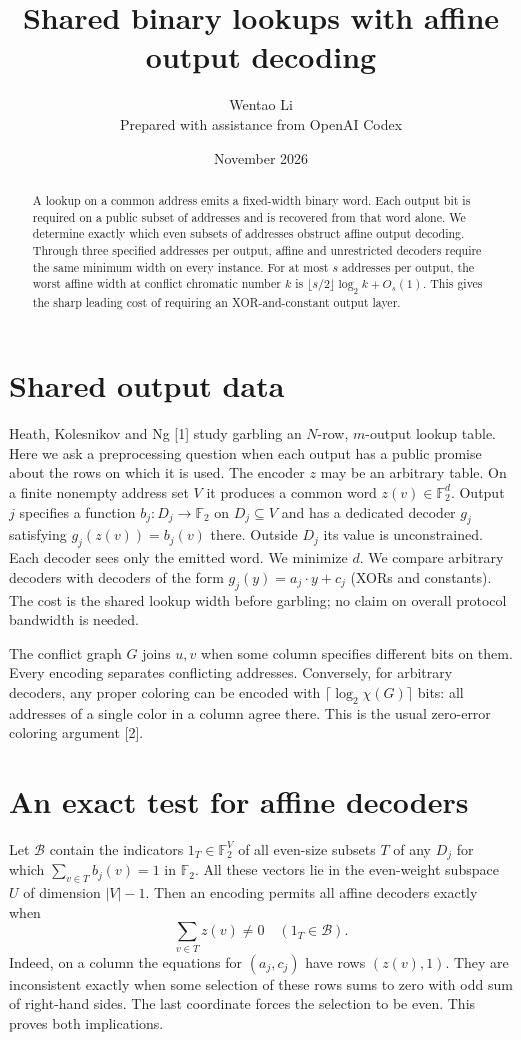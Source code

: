 \documentclass[11pt]{article}
\title{Shared binary lookups with affine output decoding}
\author{Wentao Li\\[2pt]\small Prepared with assistance from OpenAI Codex}
\date{November 2026}
\newcommand{\F}{\mathbb F_2}
\begin{document}
\maketitle
\begin{abstract}
A lookup on a common address emits a fixed-width binary word. Each output bit is required on a public subset of addresses and is recovered from that word alone. We determine exactly which even subsets of addresses obstruct affine output decoding. Through three specified addresses per output, affine and unrestricted decoders require the same minimum width on every instance. For at most $s$ addresses per output, the worst affine width at conflict chromatic number $k$ is $\lfloor s/2\rfloor\log_2 k+O_s(1)$. This gives the sharp leading cost of requiring an XOR-and-constant output layer.
\end{abstract}

\section{Shared output data}
Heath, Kolesnikov and Ng [1] study garbling an $N$-row, $m$-output lookup table. Here we ask a preprocessing question when each output has a public promise about the rows on which it is used. The encoder $z$ may be an arbitrary table. On a finite nonempty address set $V$ it produces a common word $z(v)\in\F^d$. Output $j$ specifies a function $b_j:D_j\to\F$ on $D_j\subseteq V$ and has a dedicated decoder $g_j$ satisfying $g_j(z(v))=b_j(v)$ there. Outside $D_j$ its value is unconstrained. Each decoder sees only the emitted word. We minimize $d$. We compare arbitrary decoders with decoders of the form $g_j(y)=a_j\cdot y+c_j$ (XORs and constants). The cost is the shared lookup width before garbling; no claim on overall protocol bandwidth is needed.

The conflict graph $G$ joins $u,v$ when some column specifies different bits on them. Every encoding separates conflicting addresses. Conversely, for arbitrary decoders, any proper coloring can be encoded with $\lceil\log_2\chi(G)\rceil$ bits: all addresses of a single color in a column agree there. This is the usual zero-error coloring argument [2].

\section{An exact test for affine decoders}
Let $\mathcal B$ contain the indicators $1_T\in\F^V$ of all even-size subsets $T$ of any $D_j$ for which $\sum_{v\in T}b_j(v)=1$ in $\F$. All these vectors lie in the even-weight subspace $U$ of dimension $|V|-1$. Then an encoding permits all affine decoders exactly when
\[
                   \sum_{v\in T}z(v)\ne0\quad(1_T\in\mathcal B).
\]
Indeed, on a column the equations for $(a_j,c_j)$ have rows $(z(v),1)$. They are inconsistent exactly when some selection of these rows sums to zero with odd sum of right-hand sides. The last coordinate forces the selection to be even. This proves both implications.
\end{document}
